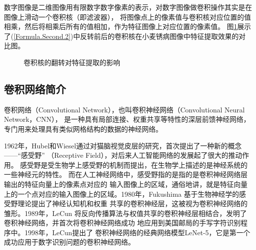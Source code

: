   数字图像是二维图像用有限数字数字像素的表示\cite{wiki:xxx}，对数字图像做卷积操作其实是在图像上滑动一个卷积核（即滤波器），
  将图像点上的像素值与卷积核对应位置的值相乘，然后将相乘后所有的值相加，作为特征图像上对应位置的像素值。
  图\ref{Figure.Second.1}展示了(\ref{Formula.Second.2})中反转前后的卷积核在小麦锈病图像中特征提取效果的对比图。
  \begin{figure}[H]
    \centering %
    \caption{卷积核的翻转对特征提取的影响}
    \label{Figure.Second.1}
  \end{figure}
  

  
  \subsection{\hei\xiaosan\textbf{卷积网络简介}}
    卷积网络（Convolutional Network），也叫卷积神经网络（Convolutional Neural Network，CNN），
    是一种具有局部连接、权重共享等特性的深层前馈神经网络，专门用来处理具有类似网格结构的数据的神经网络。
    

    1962年，Hubel和Wiesel通过对猫脑视觉皮层的研究，首次提出了一种新的概念——“感受野”
    （Receptive Field），对后来人工智能网络的发展起了很大的推动作用\cite{hubel1962receptive}。
    感受野是受生物学上感受野的机制而提出，在生物学上描述的是神经系统的一些神经元的特性。
    而在人工神经网络中，感受野指的是指的是卷积神经网络层输出的特征向量上的像素点对应的
    输入图像上的区域，通俗地讲，就是特征向量上的一个点对应的输入图像上的区域。1980年，Fukushima
    \cite{fukushima1982neocognitron}基于生物神经学的感受野理论提出了神经认知机和权重
    共享的卷积神经层，这被视为卷积神经网络的雏形。1989年，LeCun\cite{lecun1989backpropagation}
    将反向传播算法与权值共享的卷积神经层相结合，发明了卷积神经网络，并首次将卷积神经网络成功
    地应用到美国邮局的手写字符识别程序中。1998年，LeCun\cite{lecun1998gradient}提出了
    卷积神经网络的经典网络模型LeNet-5，它是第一个成功应用于数字\zs 识别问题的卷积神经网络。
    
